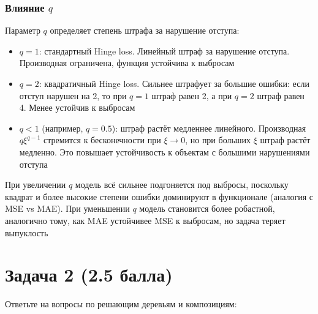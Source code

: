 \documentclass[12pt,a4paper]{article}
\begin{document}
\subsubsection*{Влияние $q$}

Параметр $q$ определяет степень штрафа за нарушение отступа:

\begin{itemize}
\item $q = 1$: стандартный Hinge loss. Линейный штраф за нарушение отступа. Производная ограничена, функция устойчива к выбросам

\item $q = 2$: квадратичный Hinge loss. Сильнее штрафует за большие ошибки: если отступ нарушен на 2, то при $q=1$ штраф равен 2, а при $q=2$ штраф равен 4. Менее устойчив к выбросам

\item $q < 1$ (например, $q = 0.5$): штраф растёт медленнее линейного. Производная $q\xi^{q-1}$ стремится к бесконечности при $\xi \to 0$, но при больших $\xi$ штраф растёт медленно. Это повышает устойчивость к объектам с большими нарушениями отступа
\end{itemize}
При увеличении $q$ модель всё сильнее подгоняется под выбросы, поскольку квадрат и более высокие степени ошибки доминируют в функционале (аналогия с MSE vs MAE). При уменьшении $q$ модель становится более робастной, аналогично тому, как MAE устойчивее MSE к выбросам, но задача теряет выпуклость


\section*{Задача 2 (2.5 балла)}

Ответьте на вопросы по решающим деревьям и композициям:
\end{document}
